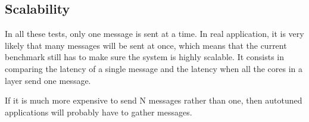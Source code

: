 \subsection{Scalability}
In all these tests, only one message is sent at a time. In real application, it
is very likely that many messages will be sent at once, which means that the
current benchmark still has to make sure the system is highly scalable. It
consists in comparing the latency of a single message and the latency when all
the cores in a layer send one message.

If it is much more expensive to send N messages rather than one, then autotuned
applications will probably have to gather messages.
